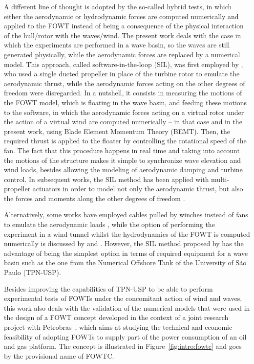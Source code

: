 A different line of thought is adopted by the so-called hybrid tests, in which either the aerodynamic or hydrodynamic forces are computed numerically and applied to the FOWT instead of being a consequence of the physical interaction of the hull/rotor with the waves/wind. The present work deals with the case in which the experiments are performed in a wave basin, so the waves are still generated physically, while the aerodynamic forces are replaced by a numerical model. This approach, called software-in-the-loop (SIL), was first employed by \citet{azcona2014aerodynamic}, who used a single ducted propeller in place of the turbine rotor to emulate the aerodynamic thrust, while the aerodynamic forces acting on the other degrees of freedom were disregarded. In a nutshell, it consists in measuring the motions of the FOWT model, which is floating in the wave basin, and feeding these motions to the software, in which the aerodynamic forces acting on a virtual rotor under the action of a virtual wind are computed numerically -- in that case and in the present work, using Blade Element Momentum Theory (BEMT). Then, the required thrust is applied to the floater by controlling the rotational speed of the fan. The fact that this procedure happens in real time and taking into account the motions of the structure makes it simple to synchronize wave elevation and wind loads, besides allowing the modeling of aerodynamic damping and turbine control. In subsequent works, the SIL method has been applied with multi-propeller actuators in order to model not only the aerodynamic thrust, but also the forces and moments along the other degrees of freedom \citep{pires2020inclusion, otter2020emulating}. 

Alternatively, some works have employed cables pulled by winches instead of fans to emulate the aerodynamic loads \citep{sauder2016real, bachynski2016real, thys2018real}, while the option of performing the experiment in a wind tunnel whilst the hydrodynamics of the FOWT is computed numerically is discussed by \citet{bayati2018wind} and \citet{belloli2020hybrid}. However, the SIL method proposed by \citet{azcona2014aerodynamic} has the advantage of being the simplest option in terms of required equipment for a wave basin such as the one from the Numerical Offshore Tank of the University of São Paulo (TPN-USP). 

Besides improving the capabilities of TPN-USP to be able to perform experimental tests of FOWTs under the concomitant action of wind and waves, this work also deals with the validation of the numerical models that were used in the design of a FOWT concept developed in the context of a joint research project with Petrobras~\citep{mas2022parametric}, which aims at studying the technical and economic feasibility of adopting FOWTs to supply part of the power consumption of an oil and gas platform. The concept is illustrated in Figure~\ref{fig:intro:fowtc} and goes by the provisional name of FOWTC. 

